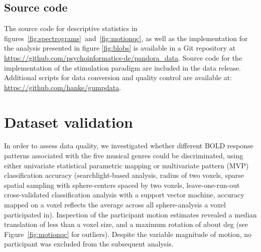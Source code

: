 \subsection*{Source code}

The source code for descriptive statistics in
figures~\ref{fig:spectrograms}~and~\ref{fig:motionqc}, as well as the
implementation for the analysis presented in figure \ref{fig:blobs} is
available in a Git repository at
\url{https://github.com/psychoinformatics-de/pandora_data}.  Source code for
the implementation of the stimulation paradigm are included in the data
release.  Additional scripts for data conversion and quality control are
available at: \url{https://github.com/hanke/gumpdata}.

\section*{Dataset validation}


In order to assess data quality, we investigated whether different BOLD
response patterns associated with the five musical genres could be
discriminated, using either univariate statistical parametric mapping or
multivariate pattern (MVP) classification accuracy (searchlight-based analysis,
radius of two voxels, sparse spatial sampling with sphere-centers spaced by two
voxels, leave-one-run-out cross-validated classification analysis with a
support vector machine, accuracy mapped on a voxel reflects the average across
all sphere-analysis a voxel participated in).  Inspection of the participant
motion estimates revealed a median translation of less than a voxel size, and a
maximum rotation of about \unit[1]{deg} (see Figure~\ref{fig:motionqc} for
outliers). Despite the variable magnitude of motion, no participant was
excluded from the subsequent analysis.

